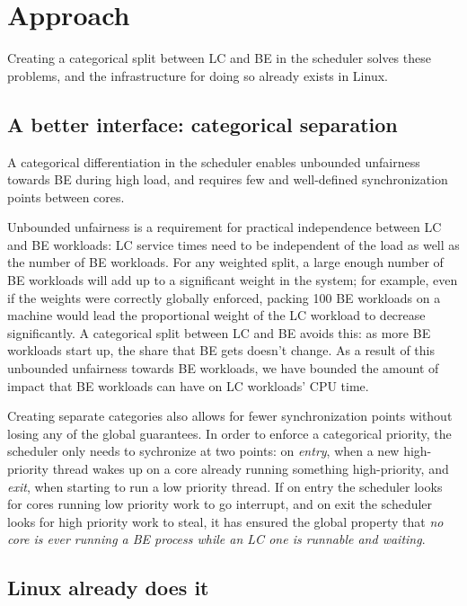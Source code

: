 \section{Approach}\label{s:approach}


Creating a categorical split between LC and BE in the scheduler solves these
problems, and the infrastructure for doing so already exists in Linux.

\subsection{A better interface: categorical separation}\label{ss:interface}

A categorical differentiation in the scheduler enables unbounded unfairness
towards BE during high load, and requires few and well-defined synchronization
points between cores.

Unbounded unfairness is a requirement for practical independence between LC and
BE workloads: LC service times need to be independent of the load as well as the
number of BE workloads. For any weighted split, a large enough number of BE
workloads will add up to a significant weight in the system; for example, even
if the weights were correctly globally enforced, packing 100 BE workloads on a
machine would lead the proportional weight of the LC workload to decrease
significantly. A categorical split between LC and BE avoids this: as more BE
workloads start up, the share that BE gets doesn't change. As a result of this
unbounded unfairness towards BE workloads, we have bounded the amount of impact
that BE workloads can have on LC workloads' CPU time.

Creating separate categories also allows for fewer synchronization points
without losing any of the global guarantees. In order to enforce a categorical
priority, the scheduler only needs to sychronize at two points: on
\textit{entry}, when a new high-priority thread wakes up on a core already
running something high-priority, and \textit{exit}, when starting to run a low
priority thread. If on entry the scheduler looks for cores running low priority
work to go interrupt, and on exit the scheduler looks for high priority work to
steal, it has ensured the global property that \textit{no core is ever running a
BE process while an LC one is runnable and waiting}.


\subsection{Linux already does it}

